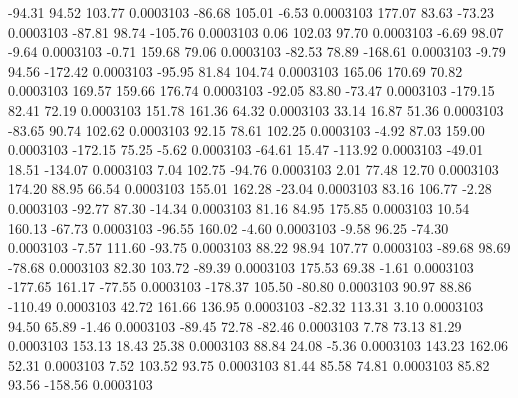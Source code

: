       -94.31       94.52      103.77     0.0003103
      -86.68      105.01       -6.53     0.0003103
      177.07       83.63      -73.23     0.0003103
      -87.81       98.74     -105.76     0.0003103
        0.06      102.03       97.70     0.0003103
       -6.69       98.07       -9.64     0.0003103
       -0.71      159.68       79.06     0.0003103
      -82.53       78.89     -168.61     0.0003103
       -9.79       94.56     -172.42     0.0003103
      -95.95       81.84      104.74     0.0003103
      165.06      170.69       70.82     0.0003103
      169.57      159.66      176.74     0.0003103
      -92.05       83.80      -73.47     0.0003103
     -179.15       82.41       72.19     0.0003103
      151.78      161.36       64.32     0.0003103
       33.14       16.87       51.36     0.0003103
      -83.65       90.74      102.62     0.0003103
       92.15       78.61      102.25     0.0003103
       -4.92       87.03      159.00     0.0003103
     -172.15       75.25       -5.62     0.0003103
      -64.61       15.47     -113.92     0.0003103
      -49.01       18.51     -134.07     0.0003103
        7.04      102.75      -94.76     0.0003103
        2.01       77.48       12.70     0.0003103
      174.20       88.95       66.54     0.0003103
      155.01      162.28      -23.04     0.0003103
       83.16      106.77       -2.28     0.0003103
      -92.77       87.30      -14.34     0.0003103
       81.16       84.95      175.85     0.0003103
       10.54      160.13      -67.73     0.0003103
      -96.55      160.02       -4.60     0.0003103
       -9.58       96.25      -74.30     0.0003103
       -7.57      111.60      -93.75     0.0003103
       88.22       98.94      107.77     0.0003103
      -89.68       98.69      -78.68     0.0003103
       82.30      103.72      -89.39     0.0003103
      175.53       69.38       -1.61     0.0003103
     -177.65      161.17      -77.55     0.0003103
     -178.37      105.50      -80.80     0.0003103
       90.97       88.86     -110.49     0.0003103
       42.72      161.66      136.95     0.0003103
      -82.32      113.31        3.10     0.0003103
       94.50       65.89       -1.46     0.0003103
      -89.45       72.78      -82.46     0.0003103
        7.78       73.13       81.29     0.0003103
      153.13       18.43       25.38     0.0003103
       88.84       24.08       -5.36     0.0003103
      143.23      162.06       52.31     0.0003103
        7.52      103.52       93.75     0.0003103
       81.44       85.58       74.81     0.0003103
       85.82       93.56     -158.56     0.0003103
